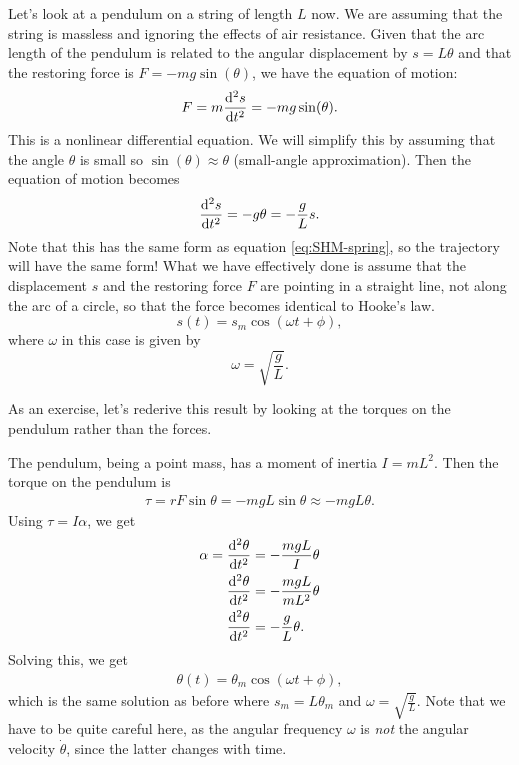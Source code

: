 \documentclass[../classical_mechanics.tex]{subfiles}
\begin{document}
        Let's look at a pendulum on a string of length $L$ now.
        We are assuming that the string is massless and ignoring the effects of air resistance.
        Given that the arc length of the pendulum is related to the angular displacement by $s=L\theta$ and that the restoring force is $F=-mg\sin(\theta)$, we have the equation of motion:
        \begin{equation}\label{eq:SHM-pendulum-s-analytic}
            F=m\dv[2]{s}{t}=-mg\sin(\theta).
        \end{equation}
        This is a nonlinear differential equation. We will simplify this by assuming that the angle $\theta$ is small so $\sin(\theta)\approx\theta$ (small-angle approximation).
        Then the equation of motion becomes
        \begin{equation}
            \dv[2]{s}{t}=-g\theta=-\frac{g}{L}s.
        \end{equation}
        Note that this has the same form as equation \ref{eq:SHM-spring}, so the trajectory will have the same form!
        What we have effectively done is assume that the displacement $s$ and the restoring force $F$ are pointing in a straight line, not along the arc of a circle, so that the force becomes identical to Hooke's law.
        \begin{equation}
            s(t)=s_m\cos(\omega t+\phi),
        \end{equation}
        where $\omega$ in this case is given by
        \begin{equation}
            \omega=\sqrt{\frac{g}{L}}.
        \end{equation}
        \begin{example}
            As an exercise, let's rederive this result by looking at the torques on the pendulum rather than the forces.

            The pendulum, being a point mass, has a moment of inertia $I=mL^2$.
            Then the torque on the pendulum is
            \begin{eqnarray}
                \tau=rF\sin\theta=-mgL\sin\theta\approx -mgL\theta.
            \end{eqnarray}
            Using $\tau=I\alpha$, we get
            \begin{align}
                \alpha=\dv[2]{\theta}{t}&=-\frac{mgL}{I}\theta\label{eq:SHM-pendulum-theta-moi}\\
                \dv[2]{\theta}{t}&=-\frac{mgL}{mL^2}\theta\\
                \dv[2]{\theta}{t}&=-\frac{g}{L}\theta.
            \end{align}
            Solving this, we get
            \begin{eqnarray}
                \theta(t)=\theta_m\cos(\omega t+\phi),
            \end{eqnarray}
            which is the same solution as before where $s_m=L\theta_m$ and $\omega=\sqrt{\frac{g}{L}}$.
            Note that we have to be quite careful here, as the angular frequency $\omega$ is \textit{not} the angular velocity $\dot{\theta}$, since the latter changes with time.
        \end{example}
\end{document}
